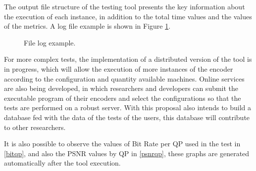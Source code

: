 \documentclass[journal]{IEEEtran}
\begin{document}
The output file structure of the testing tool presents the key information about the execution of each instance, in addition to the total time values and the values of the metrics. A log file example is shown in Figure \ref{fig:log}.

\FloatBarrier

\begin{figure}[!ht]
	\centering
	\caption{File log example.}
	\label{fig:log}
\end{figure}

\FloatBarrier

For more complex tests, the implementation of a distributed version of the tool is in progress, which will allow the execution of more instances of the encoder according to the configuration and quantity available machines. Online services are also being developed, in which researchers and developers can submit the executable program of their encoders and select the configurations so that the tests are performed on a robust server. With this proposal also intends to build a database fed with the data of the tests of the users, this database will contribute to other researchers.

It is also possible to observe the values of Bit Rate per QP used in the test in \ref{bitqp}, and also the PSNR values by QP in \ref{psnrqp}, these graphs are generated automatically after the tool execution.
\end{document}
